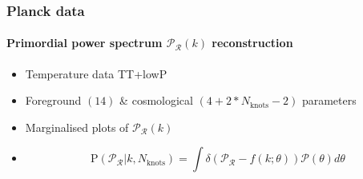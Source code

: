 \documentclass[]{beamer}
\newcommand{\posterior}{\mathcal{P}}
\newcommand{\prob}{\mathrm{P}}
\newcommand{\PR}{\mathcal{P}_\mathcal{R}}
\newcommand{\Pknotj}[1]{\mathcal{P}_{#1}}
\newcommand{\Nknots}{N_\mathrm{knots}}
\newcommand{\movablecross}[1]{%
  \draw[->](#1) -- ++(0:\croslen);
  \draw[->](#1) -- ++(90:\croslen);
  \draw[->](#1) -- ++(180:\croslen);
  \draw[->](#1) -- ++(270:\croslen);
  \fill[red!70!black] (#1) circle (2pt);
}
\newcommand{\movablevert}[1]{%
  \draw[->](#1) -- ++(90:\croslen);
  \draw[->](#1) -- ++(270:\croslen);
  \fill[red!70!black] (#1) circle (2pt);
}
\begin{document}
\begin{frame}
{\begin{tikzpicture}





    \end{tikzpicture}

  }

\end{frame}


\begin{frame}
  \frametitle{Planck data}
  \framesubtitle{Primordial power spectrum $\PR(k)$ reconstruction}
  \begin{itemize}
    \item<2-> Temperature data TT+lowP
    \item<3-> Foreground $(14)$ \& cosmological $(4 +2*\Nknots-2)$  parameters
    \item<4-> Marginalised plots of $\PR(k)$
    \item<5->
      \[ \prob(\PR|k,\Nknots) = \int \delta(\PR-f(k;\theta))\posterior(\theta)d\theta \]
  \end{itemize}
\end{frame}
\end{document}
